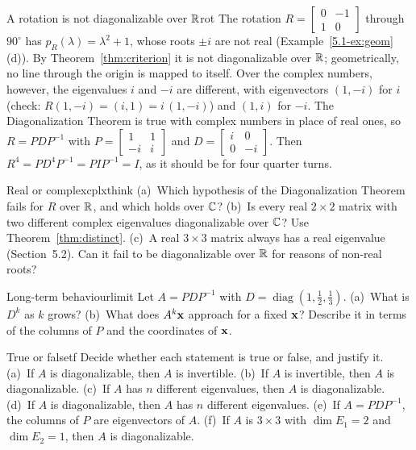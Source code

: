 \documentclass[11pt]{article}
\begin{document}
\begin{exmp}{A rotation is not diagonalizable over $\mathbb{R}$}{rot}
The rotation $R=\begin{bmatrix}0&-1\\1&0\end{bmatrix}$ through $90^\circ$ has $p_R(\lambda)=\lambda^2+1$, whose roots $\pm i$ are not real (Example~\ref{5.1-ex:geom}(d)). By Theorem~\ref{thm:criterion} it is not diagonalizable over $\mathbb{R}$; geometrically, no line through the origin is mapped to itself. Over the complex numbers, however, the eigenvalues $i$ and $-i$ are different, with eigenvectors $(1,-i)$ for $i$ (check: $R(1,-i)=(i,1)=i\,(1,-i)$) and $(1,i)$ for $-i$. The Diagonalization Theorem is true with complex numbers in place of real ones, so $R=PDP^{-1}$ with $P=\begin{bmatrix}1&1\\-i&i\end{bmatrix}$ and $D=\begin{bmatrix}i&0\\0&-i\end{bmatrix}$. Then $R^4=PD^4P^{-1}=PIP^{-1}=I$, as it should be for four quarter turns.
\end{exmp}

\begin{think}{Real or complex}{cplxthink}
(a)~Which hypothesis of the Diagonalization Theorem fails for $R$ over $\mathbb{R}$, and which holds over $\mathbb{C}$? (b)~Is every real $2\times2$ matrix with two different complex eigenvalues diagonalizable over $\mathbb{C}$? Use Theorem~\ref{thm:distinct}. (c)~A real $3\times3$ matrix always has a real eigenvalue (Section~5.2). Can it fail to be diagonalizable over $\mathbb{R}$ for reasons of non-real roots?
\end{think}

\begin{think}{Long-term behaviour}{limit}
Let $A=PDP^{-1}$ with $D=\operatorname{diag}(1,\tfrac12,\tfrac13)$. (a)~What is $D^k$ as $k$ grows? (b)~What does $A^k\mathbf{x}$ approach for a fixed $\mathbf{x}$? Describe it in terms of the columns of $P$ and the coordinates of $\mathbf{x}$.
\end{think}

\begin{kc}{True or false}{tf}
Decide whether each statement is true or false, and justify it. (a)~If $A$ is diagonalizable, then $A$ is invertible. (b)~If $A$ is invertible, then $A$ is diagonalizable. (c)~If $A$ has $n$ different eigenvalues, then $A$ is diagonalizable. (d)~If $A$ is diagonalizable, then $A$ has $n$ different eigenvalues. (e)~If $A=PDP^{-1}$, the columns of $P$ are eigenvectors of $A$. (f)~If $A$ is $3\times3$ with $\dim E_1=2$ and $\dim E_2=1$, then $A$ is diagonalizable.
\end{kc}
\end{document}
